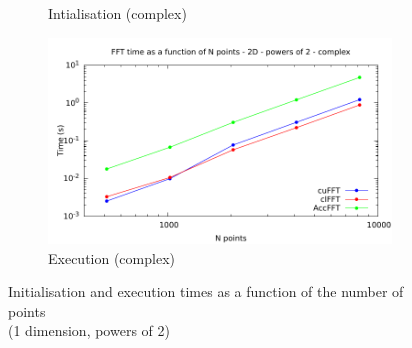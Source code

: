 \documentclass[12pt, a4paper]{article}
\begin{document}
\begin{figure}[H]
\begin{subfigure}{.5\textwidth}
\caption{Intialisation (complex)}
\label{FFTPOW22DCI}
\end{subfigure}%
\begin{subfigure}{.5\textwidth}
\centering
\includegraphics[width=.9\linewidth]{graphs/fft-2d-pow2-c-exec.pdf}
\caption{Execution (complex)}
\label{FFTPOW22DCE}
\end{subfigure}
\caption{Initialisation and execution times as a function of the number of points\\(1 dimension, powers of 2)}
\label{FFTPOW22D}
\end{figure}
\end{document}
